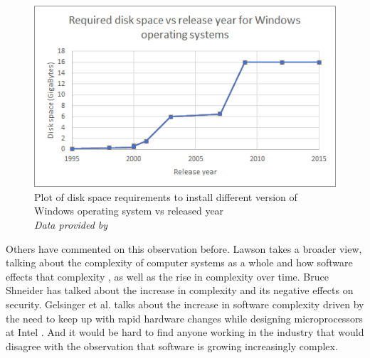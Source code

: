 \begin{figure} \begin{center}
\includegraphics[width=0.8\linewidth]{pics/windows_year_size_plot} 
\end{center} 
\caption{Plot of disk space requirements to install different version of Windows operating system vs released year\\ \textit{\small{Data provided by }}}
\label{win_year_size_plot}
\end{figure}

Others have commented on this observation before. Lawson takes a broader view, talking about the complexity of computer systems as a whole and how software effects that complexity 
\cite{RN55}, as well as the rise in complexity over time. Bruce Shneider has talked about the increase in complexity and its negative effects on security. Gelsinger et al. talks about the increase in software complexity driven by the need to keep up with rapid hardware changes while designing microprocessors at Intel 
\cite{RN18}. And it would be hard to find anyone working in the industry that would disagree with the observation that software is growing increasingly complex.\\

